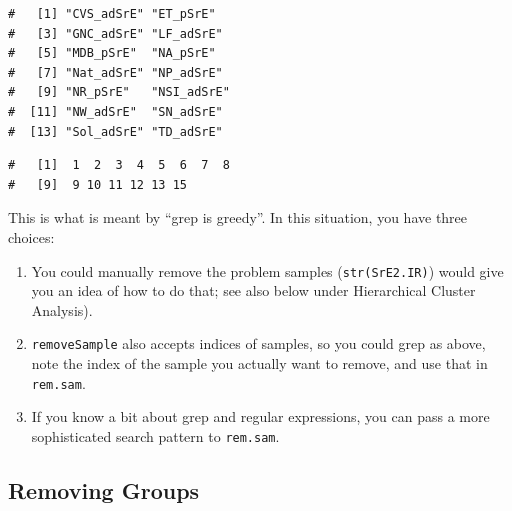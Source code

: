 \documentclass[letter,10pt,twocolumn,twoside,printwatermark=false]{pinp}
\begin{document}
\begin{Shaded}
\begin{Highlighting}[]
\StringTok{ }\NormalTok{(}\OperatorTok{$}
\OperatorTok{$}
\end{Highlighting}
\end{Shaded}

\begin{ShadedResult}
\begin{verbatim}
#   [1] "CVS_adSrE" "ET_pSrE"  
#   [3] "GNC_adSrE" "LF_adSrE" 
#   [5] "MDB_pSrE"  "NA_pSrE"  
#   [7] "Nat_adSrE" "NP_adSrE" 
#   [9] "NR_pSrE"   "NSI_adSrE"
#  [11] "NW_adSrE"  "SN_adSrE" 
#  [13] "Sol_adSrE" "TD_adSrE"
\end{verbatim}
\end{ShadedResult}

\begin{Shaded}
\begin{Highlighting}[]
\end{Highlighting}
\end{Shaded}

\begin{ShadedResult}
\begin{verbatim}
#   [1]  1  2  3  4  5  6  7  8
#   [9]  9 10 11 12 13 15
\end{verbatim}
\end{ShadedResult}

This is what is meant by ``grep is greedy''. In this situation, you have
three choices:

\begin{enumerate}
  \item You could manually remove the problem samples (\texttt{str(SrE2.IR)}) would give you an idea of how to do that; see also below under Hierarchical Cluster Analysis).
  \item \texttt{removeSample} also accepts indices of samples, so you could grep as above, note the index of the sample you actually want to remove, and use that in \texttt{rem.sam}.
  \item If you know a bit about grep and regular expressions, you can pass a more sophisticated search pattern to \texttt{rem.sam}.
\end{enumerate}

\hypertarget{removing-groups}{%
\subsection{Removing Groups}\label{removing-groups}}
\end{document}
